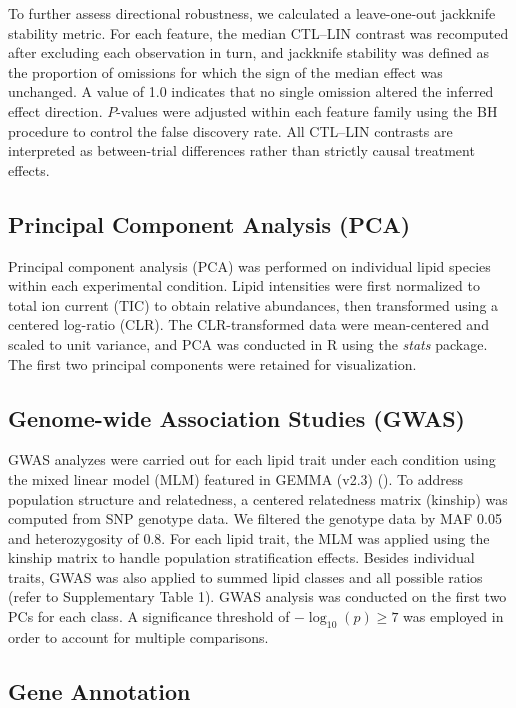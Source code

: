 \documentclass[9pt,twocolumn,twoside]{rilabRxiv}
\begin{document}
To further assess directional robustness, we calculated a leave-one-out jackknife stability metric. For each feature, the median CTL--LIN contrast was recomputed after excluding each observation in turn, and jackknife stability was defined as the proportion of omissions for which the sign of the median effect was unchanged. A value of 1.0 indicates that no single omission altered the inferred effect direction. \(P\)-values were adjusted within each feature family using the BH procedure to control the false discovery rate. All CTL--LIN contrasts are interpreted as between-trial differences rather than strictly causal treatment effects.


\subsection*{Principal Component Analysis (PCA)}

Principal component analysis (PCA) was performed on individual lipid species within each experimental condition. Lipid intensities were first normalized to total ion current (TIC) to obtain relative abundances, then transformed using a centered log-ratio (CLR). The CLR-transformed data were mean-centered and scaled to unit variance, and PCA was conducted in R using the \emph{stats} package. The first two principal components were retained for visualization.


\subsection*{Genome-wide Association Studies (GWAS)} 

GWAS analyzes were carried out for each lipid trait under each condition using the mixed linear model (MLM) featured in GEMMA (v2.3) (\cite{Zhou2012}). To address population structure and relatedness, a centered relatedness matrix (kinship) was computed from SNP genotype data. We filtered the genotype data by MAF 0.05 and heterozygosity of 0.8. For each lipid trait, the MLM was applied using the kinship matrix to handle population stratification effects. Besides individual traits, GWAS was also applied to summed lipid classes and all possible ratios (refer to Supplementary Table 1). GWAS analysis was conducted on the first two PCs for each class. A significance threshold of \(-\log_{10}(p) \geq 7\) was employed in order to account for multiple comparisons. 

\subsection*{Gene Annotation}
\end{document}
